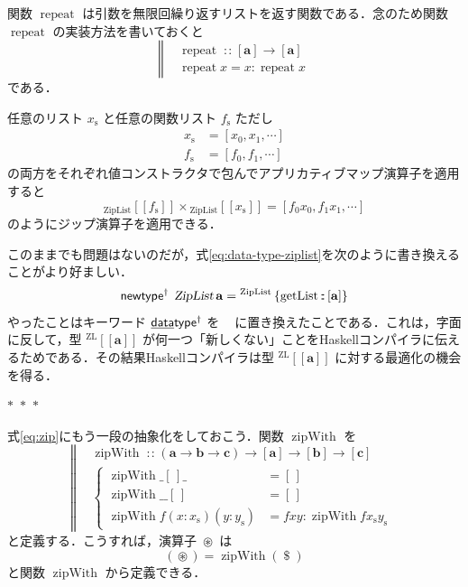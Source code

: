 \documentclass[a5paper,twoside,fleqn,draft]{jsbook}
\def\[{[\![}
\def\]{]\!]}
\newcommand{\separator}{\begin{center}$*$~$*$~$*$\end{center}}
\newcommand{\programminglanguage}[1]{\textsf{#1}}
\newcommand{\haskell}{\programminglanguage{Haskell}}
\newcommand{\mBrace}{\Vert}
\newcommand{\mKeyword}[1]{\mathsf{#1}}
\newcommand{\mKeywordUnderline}[1]{\text{\underline{\textsf{#1}}}}
\newcommand{\mDataTypeKeyword}{\mKeywordUnderline{data}\mKeyword{type}}
\newcommand{\mNewTypeDeclKeyword}{\mKeyword{newtype}}
\newcommand{\mPolymorphic}[1]{{#1}^\dagger}
\DeclareMathOperator{\mDataTypePolymorphic}{\mDataTypeKeyword^\dagger}
\DeclareMathOperator{\mNewTypeDeclPolymorphic}{\mPolymorphic{\mNewTypeDeclKeyword}}
\newcommand{\mEmptyList}{{[\,]}}
\newcommand{\mSpecialFunc}[1]{\mathrm{#1}}
\DeclareMathOperator{\mGetList}{\mSpecialFunc{getList}}
\DeclareMathOperator{\mRepeat}{\mSpecialFunc{repeat}}
\DeclareMathOperator{\mZipWith}{\mSpecialFunc{zipWith}}
\DeclareMathOperator{\mApply}{\$}
\DeclareMathOperator{\mAppMap}{\times}
\DeclareMathOperator{\mFuncArrow}{\rightarrow}
\DeclareMathOperator{\mIn}{{:\!:}}
\DeclareMathOperator{\mZip}{\circledast}
\newcommand{\mType}[1]{\mathbf{#1}} %
\newcommand{\mA}{\mType{a}}
\newcommand{\mB}{\mType{b}}
\newcommand{\mC}{\mType{c}}
\newcommand{\mTypeAssemble}[2]{{}^\mathrm{#1}\[\mType{#2}\]}
\newcommand{\mZipListType}[1]{\mTypeAssemble{ZL}{#1}}
\newcommand{\mTypeConstructor}[1]{\textsl{#1}}
\DeclareMathOperator{\mZipListTypeConstructor}{\mTypeConstructor{ZipList}}
\newcommand{\mValueConstructor}[1]{\mathrm{#1}}
\newcommand{\mValueWith}[2]{{}_\mValueConstructor{#1}\[#2\]}
\newcommand{\mValueRecordBeginWith}[1]{{}^\mValueConstructor{#1}\,\{}
\newcommand{\mValueRecordEnd}{\}}
\newcommand{\mValueRecordWith}[2]{\mValueRecordBeginWith{#1}{#2}\mValueRecordEnd}
\newcommand{\mZipListWith}[1]{\mValueWith{ZipList}{#1}}
\newcommand{\mZipListRecordWith}[1]{\mValueRecordWith{ZipList}{#1}}
\newcommand{\mList}[1]{{#1}_\mathrm{s}}
\newcommand{\mProjEXP}[2]{#1\mFuncArrow#2} %
\begin{document}
関数 $\mRepeat$ は引数を無限回繰り返すリストを返す関数である．念のため関数 $\mRepeat$ の実装方法を書いておくと
\begin{equation}
  \left\mBrace
  \begin{aligned}
    &\mRepeat\mIn{}\mProjEXP{[\mA]}{[\mA]}\\
    &\mRepeat x=x:\mRepeat x
  \end{aligned}
  \right.
\end{equation}
である．

任意のリスト $\mList{x}$ と任意の関数リスト $\mList{f}$ ただし
\begin{align}
\mList{x}&=[x_0,x_1,\dotsb]\\
\mList{f}&=[f_0,f_1,\dotsb]
\end{align}
の両方をそれぞれ値コンストラクタで包んでアプリカティブマップ演算子を適用すると
\begin{equation}
  \mZipListWith{\mList{f}}\mAppMap\mZipListWith{\mList{x}}
  =[f_0x_0,f_1x_1,\dotsb]
\end{equation}
のようにジップ演算子を適用できる．

このままでも問題はないのだが，式\eqref{eq:data-type-ziplist}を次のように書き換えることがより好ましい．
\begin{equation}
  \mNewTypeDeclPolymorphic\;
  \mZipListTypeConstructor\mA
  =\mZipListRecordWith{\mGetList\mIn{}[\mA]}
\end{equation}
やったことはキーワード $\mDataTypePolymorphic$ を
$\mNewTypeDeclPolymorphic$ に置き換えたことである．これは，字面に反して，型 $\mZipListType{a}$ が何一つ「新しくない」ことを\haskell コンパイラに伝えるためである．その結果\haskell コンパイラは型 $\mZipListType{a}$ に対する最適化の機会を得る．

\separator

式\eqref{eq:zip}にもう一段の抽象化をしておこう．関数 $\mZipWith$ を
\begin{equation}
  \left\mBrace
  \begin{aligned}
    {}&\mZipWith\mIn{}\mProjEXP{\mProjEXP{\mProjEXP{(\mProjEXP{\mA }
          {\mProjEXP{\mB }{\mC }})}
        {[\mA]}}{[\mB]}}{[\mC]}\\
    {}&\left\{\begin{aligned}
    \mZipWith\_\mEmptyList\_
    &=\mEmptyList\\
    \mZipWith\_\_\mEmptyList
    &=\mEmptyList\\
    \mZipWith f(x:\mList{x})(y:\mList{y})
    &=fxy:\mZipWith f\mList{x}\mList{y}
    \end{aligned}
    \right.
  \end{aligned}
  \right.
\end{equation}
と定義する．こうすれば，演算子 $\mZip$ は
\begin{equation}
  (\mZip)
  =\mZipWith(\mApply)
\end{equation}
と関数 $\mZipWith$ から定義できる．
\end{document}
